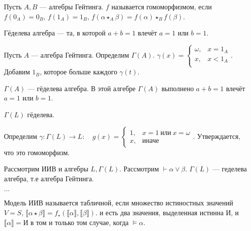 \begin{definition}
    Пусть $A, B$ --- алгебры Гейтинга. 
    $f$ называется гомоморфизмом, если $f(0_A) = 0_B$, $f(1_A) = 1_B$, $f (\alpha \star_A \beta) = f(\alpha) \star_B f(\beta)$.
\end{definition}

\begin{definition}
    Гёделева алгебра --- та, в которой $a + b = 1$ влечёт $a=1$ или $b=1$.
\end{definition}

\begin{definition}
    Пусть $A$ --- алгебра Гейтинга.
    Определим $\Gamma (A)$.
    $\gamma(x) = \begin{cases}
        \omega, & x = 1_A \\
        x, & x < 1_A \\
    \end{cases}$.
    Добавим $1_B$, которое больше каждого $\gamma(t)$. 
\end{definition}

\begin{theorem}
    $\Gamma (A)$ --- гёделева алгебра.
    В этой алгебре $\Gamma (A)$ выполнено $a + b = 1$ влечёт $a=1$ или $b=1$.  
\end{theorem}

\begin{theorem}
    $\Gamma (L)$ гёделева. 
\end{theorem}

Определим $\gamma : \Gamma(L) \to L: \quad g(x) = \begin{cases}
    1, & x = 1\ \text{или}\ x = \omega \\
    x, & \text{иначе} 
\end{cases}$. 
Утверждается, что это гомоморфизм.

Рассмотрим ИИВ и алгебры $L, \Gamma (L)$.
Рассмотрим $\vdash \alpha \lor \beta$.
$\Gamma (L)$ --- геделева алгебра, т.е алгебра Гейтинга.

$\ldots $

\begin{definition}
    Модель ИИВ называется табличной, если множество истиностных значений $V = S$, $\llbracket \alpha \star \beta \rrbracket = f_\star (\llbracket \alpha \rrbracket, \llbracket \beta \rrbracket)$.
    и есть два значения, выделенная истинна И, и $\llbracket \alpha \rrbracket = \text{И}$ в том и только том случае, когда $\vDash \alpha$.     
\end{definition}

\endinput